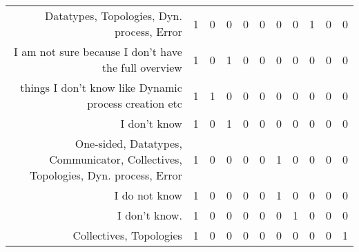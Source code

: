 {\begin{landscape}
\begin{longtable}[htb]{r|c|c|c|c|c|c|c|c|c|c}
{Datatypes, Topologies, Dyn. process, Error} & 1 & 0 & 0 & 0 & 0 & 0 & 0 & 1 & 0 & 0 \\%
{I am not sure because I don't have the full overview} & 1 & 0 & 1 & 0 & 0 & 0 & 0 & 0 & 0 & 0 \\%
{things I don't know like Dynamic process creation etc} & 1 & 1 & 0 & 0 & 0 & 0 & 0 & 0 & 0 & 0 \\%
{I don't know} & 1 & 0 & 1 & 0 & 0 & 0 & 0 & 0 & 0 & 0 \\%
{One-sided, Datatypes, Communicator, Collectives, Topologies, Dyn. process, Error} & 1 & 0 & 0 & 0 & 0 & 1 & 0 & 0 & 0 & 0 \\%
{I do not know} & 1 & 0 & 0 & 0 & 0 & 1 & 0 & 0 & 0 & 0 \\%
{I don't know.} & 1 & 0 & 0 & 0 & 0 & 0 & 1 & 0 & 0 & 0 \\%
{Collectives, Topologies} & 1 & 0 & 0 & 0 & 0 & 0 & 0 & 0 & 0 & 1 \\%
\hline%
\end{longtable}%
\end{landscape}}%
\clearpage%
